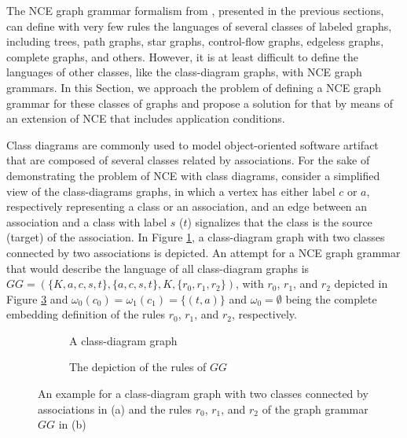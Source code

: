 
The NCE graph grammar formalism from \cite{janssens1982graph}, presented in the previous sections, can define with very few rules the languages of several classes of labeled graphs, including trees, path graphs, star graphs, control-flow graphs, edgeless graphs, complete graphs, and others. However, it is at least difficult to define the languages of other classes, like the class-diagram graphs, with NCE graph grammars. In this Section, we approach the problem of defining a NCE graph grammar for these classes of graphs and propose a solution for that by means of an extension of NCE that includes application conditions.

Class diagrams are commonly used to model object-oriented software artifact that are composed of several classes related by associations. For the sake of demonstrating the problem of NCE with class diagrams, consider a simplified view of the class-diagrams graphs, in which a vertex has either label $c$ or $a$, respectively representing a class or an association, and an edge between an association and a class with label $s$ ($t$) signalizes that the class is the source (target) of the association. In Figure \ref{fig:classdiagram-g}, a class-diagram graph with two classes connected by two associations is depicted. An attempt for a NCE graph grammar that would describe the language of all class-diagram graphs is $GG = (\{K,a,c,s,t\}, \{a,c,s,t\}, K, \{r_0, r_1, r_2\})$, with $r_0$, $r_1$, and $r_2$ depicted in Figure \ref{fig:classdiagram-gg} and $\omega_0(c_0) = \omega_1(c_1) = \{(t,a)\}$ and $\omega_0 = \emptyset$ being the complete embedding definition of the rules $r_0$, $r_1$, and $r_2$, respectively.

\begin{figure}[h]
	\begin{subfigure}[t]{0.3\textwidth}
		\centering
		
		\caption{A class-diagram graph}
		\label{fig:classdiagram-g}
	\end{subfigure}
	\begin{subfigure}[t]{0.68\textwidth}
		\centering
		
		\caption{The depiction of the rules of $GG$}
		\label{fig:classdiagram-gg}
	\end{subfigure}
	\caption{An example for a class-diagram graph with two classes connected by associations in (a) and the rules $r_0$, $r_1$, and $r_2$ of the graph grammar $GG$ in (b)}
\end{figure}

